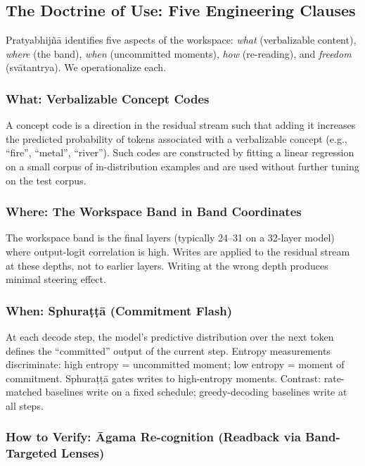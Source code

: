 \label{sec:method}

\subsection*{The Doctrine of Use: Five Engineering Clauses}

Pratyabhij\~n\=a identifies five aspects of the workspace: {\em what} (verbalizable content),
{\em where} (the band), {\em when} (uncommitted moments), {\em how} (re-reading), and {\em freedom} (sv\=atantrya).
We operationalize each.

\subsubsection*{What: Verbalizable Concept Codes}

A concept code is a direction in the residual stream such that adding it increases the predicted probability
of tokens associated with a verbalizable concept (e.g., ``fire'', ``metal'', ``river'').
Such codes are constructed by fitting a linear regression on a small corpus of in-distribution examples
and are used without further tuning on the test corpus.

\subsubsection*{Where: The Workspace Band in Band Coordinates}

The workspace band is the final layers (typically 24--31 on a 32-layer model) where output-logit correlation
is high.
Writes are applied to the residual stream at these depths, not to earlier layers.
Writing at the wrong depth produces minimal steering effect.

\subsubsection*{When: Sphura\d{t}\d{t}\=a (Commitment Flash)}

At each decode step, the model's predictive distribution over the next token defines the ``committed'' output
of the current step.
Entropy measurements discriminate: high entropy = uncommitted moment; low entropy = moment of commitment.
Sphura\d{t}\d{t}\=a gates writes to high-entropy moments.
Contrast: rate-matched baselines write on a fixed schedule; greedy-decoding baselines write at all steps.

\subsubsection*{How to Verify: \=Agama Re-cognition (Readback via Band-Targeted Lenses)}

